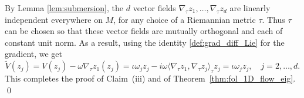 \documentclass[12pt,oneside]{article}
\newcommand{\Path }{}
\newcommand{\metric}{\tau}
\begin{document}
By Lemma \ref{lem:submersion}, the $d$ vector fields $\nabla_\metric z_1, \ldots, \nabla_\metric z_d$ are linearly independent everywhere on $M$, for any choice of a Riemannian metric $\metric$. Thus $\metric$ can be chosen so that these vector fields are mutually orthogonal and each of constant unit norm. As a result, using the identity \eqref{def:grad_diff_Lie} for the gradient, we get
%
\[ \tilde{V}(z_j) = V(z_j) - \omega \nabla_{\metric} z_1(z_j) = \iota \omega_j z_j - i \omega \langle \nabla_{\metric} z_1 , \nabla_{\metric} z_j \rangle_{\metric} z_j = \iota \omega_j z_j, \quad j=2,\ldots,d . \]
%
This completes the proof of Claim~(iii) and of Theorem~\ref{thm:fol_1D_flow_eig}. \qed



\end{document}
